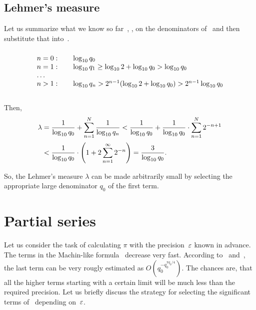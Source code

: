 \documentclass[draft, 10pt]{article} %
\begin{document}
\subsection{Lehmer's measure}

Let us summarize what we know so far~,
, on the denominators of~
and then substitute that into~.
\begin{equation}\mlabel{next-log}\vcenter{\hbox to 10em{\hss\vbox{
\begin{center}
\begin{tabular}{ l l }
$n=0:\quad$ & $\lg q_0$ \\
$n=1:$ & $\lg q_1 \ge \lg 2 + \lg q_0 > \lg q_0$ \\
$\dots$ \\
$n>1:$ & $\lg q_n > 2^{n-1} (\lg 2 + \lg q_0) > 2^{n-1} \lg q_0$ \\
\end{tabular}
\end{center}%
}\hss}}\end{equation}

Then,
%
\begin{equation}\mlabel{lehmer-switch}
\begin{array}{l}
\lambda = \dfrac{1}{\lg q_0} + \ds\sum_{n=1}^N \dfrac{1}{\lg q_n}
    < \dfrac{1}{\lg q_0} + \dfrac{1}{\lg q_0} \cdot \ds\sum_{n=1}^N 2^{-n+1} \\[1.5em]
\phantom{\lambda} < \dfrac{1}{\lg q_0} \cdot \left( 1 + 2\ds\sum_{n=1}^\infty 2^{-n} \right)
    = \dfrac{3}{\lg q_0}.
\end{array}
\end{equation}

So, the Lehmer's measure $\lambda$ can be made arbitrarily small by selecting
the appropriate large denominator $q_0$ of the first term.

\section{Partial series}

Let us consider the task of calculating $\pi$ with the precision~$\varepsilon$ known in advance.
The terms in the Machin-like formula~ decrease very fast.
According to~ and~, the last term
can be very rougly estimated as $O(q_0^{-q_0^{\pi q_0/4}})$.
The chances are, that all the higher terms starting with a certain limit will be much less
than the required precision. Let us briefly discuss the strategy for selecting
the significant terms of~ depending on~$\varepsilon$.
\end{document}
